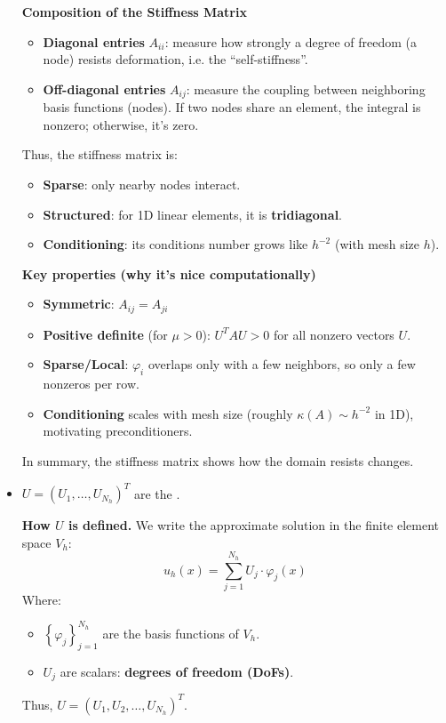 \begin{itemize}
    \textcolor{Green3}{ \textbf{Composition of the Stiffness Matrix}}
    \begin{itemize}
        \item \textbf{Diagonal entries} $A_{ii}$: measure how strongly a degree of freedom (a node) resists deformation, i.e. the ``self-stiffness''.
        \item \textbf{Off-diagonal entries} $A_{ij}$: measure the coupling between neighboring basis functions (nodes). If two nodes share an element, the integral is nonzero; otherwise, it's zero.
    \end{itemize}
    Thus, the stiffness matrix is:
    \begin{itemize}
        \item \textbf{Sparse}: only nearby nodes interact.
        \item \textbf{Structured}: for 1D linear elements, it is \textbf{tridiagonal}.
        \item \textbf{Conditioning}: its conditions number grows like $h^{-2}$ (with mesh size $h$).
    \end{itemize}

    \newpage

    \textcolor{Green3}{ \textbf{Key properties (why it's nice computationally)}}
    \begin{itemize}
        \item \textbf{Symmetric}: $A_{ij} = A_{ji}$
        \item \textbf{Positive definite} (for $\mu>0$): $U^{T} A U>0$ for all nonzero vectors $U$.
        \item \textbf{Sparse/Local}: $\varphi_{i}$ overlaps only with a few neighbors, so only a few nonzeros per row.
        \item \textbf{Conditioning} scales with mesh size (roughly $\kappa\left(A\right) \sim h^{-2}$ in 1D), motivating preconditioners.
    \end{itemize}
    In summary, the stiffness matrix shows how the domain resists changes.


    \item $U = \left(U_1,\dots,U_{N_h}\right)^{T}$ are the .
    
    \textcolor{Green3}{ \textbf{How $U$ is defined.}} We write the approximate solution in the finite element space $V_h$:
    \begin{equation*}
        u_h(x) = \displaystyle\sum_{j=1}^{N_h} U_j \cdot \varphi_j(x)
    \end{equation*}
    Where:
    \begin{itemize}
        \item $\left\{\varphi_j\right\}_{j=1}^{N_h}$ are the basis functions of $V_h$.
        \item $U_j$ are scalars: \textbf{degrees of freedom (DoFs)}.
    \end{itemize}
    Thus, $U = \left(U_1, U_2, \dots, U_{N_h}\right)^T$.


\end{itemize}
